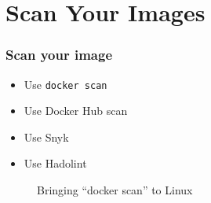 \documentclass[10pt, compress]{beamer}
\begin{document}
\section{Scan Your Images}

\begin{frame}[fragile]
  \frametitle{Scan your image}
  
  \begin{itemize}
      \item Use \texttt{docker scan}
      \item Use Docker Hub scan
      \item Use Snyk
      \item Use Hadolint
  \end{itemize}
  
  \begin{figure}
      \centering
      \caption{Bringing ``docker scan'' to Linux}
  \end{figure}
\end{frame}

\end{document}

